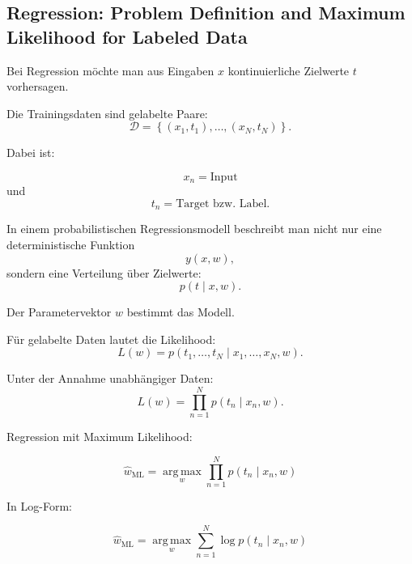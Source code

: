 \documentclass[11pt,a4paper]{scrartcl}
\newcommand{\set}[1]{\left\{ #1 \right\}}
\begin{document}
\subsection{Regression: Problem Definition and Maximum Likelihood for Labeled Data}

\begin{notebox}
    Bei Regression möchte man aus Eingaben \(x\) kontinuierliche Zielwerte \(t\)
    vorhersagen.

    Die Trainingsdaten sind gelabelte Paare:
    \[
        \mathcal{D}
        =
        \set{(x_1,t_1),\dots,(x_N,t_N)}.
    \]

    Dabei ist:

    \[
        x_n = \text{Input}
    \]
    und
    \[
        t_n = \text{Target bzw. Label}.
    \]
\end{notebox}

\begin{solutionbox}
    In einem probabilistischen Regressionsmodell beschreibt man nicht nur eine
    deterministische Funktion
    \[
        y(x,w),
    \]
    sondern eine Verteilung über Zielwerte:
    \[
        p(t \mid x,w).
    \]

    Der Parametervektor \(w\) bestimmt das Modell.

    Für gelabelte Daten lautet die Likelihood:
    \[
        L(w)
        =
        p(t_1,\dots,t_N \mid x_1,\dots,x_N,w).
    \]

    Unter der Annahme unabhängiger Daten:
    \[
        L(w)
        =
        \prod_{n=1}^{N}
        p(t_n \mid x_n,w).
    \]
\end{solutionbox}

\begin{answerbox}
    Regression mit Maximum Likelihood:

    \[
        \boxed{
            \hat w_{\mathrm{ML}}
            =
            \operatorname*{arg\,max}_{w}
            \prod_{n=1}^{N}
            p(t_n \mid x_n,w)
        }
    \]

    In Log-Form:

    \[
        \boxed{
            \hat w_{\mathrm{ML}}
            =
            \operatorname*{arg\,max}_{w}
            \sum_{n=1}^{N}
            \log p(t_n \mid x_n,w)
        }
    \]
\end{answerbox}

\end{document}
